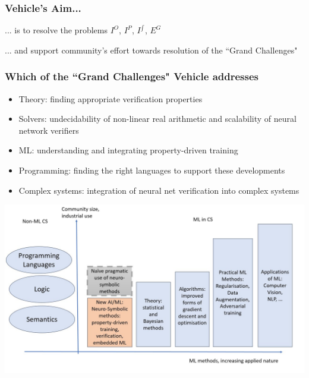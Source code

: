 \documentclass{beamer}
\begin{document}
\begin{frame}
\frametitle{\textbf{Vehicle}'s Aim...}

\alert{... is to resolve the problems $I^O$, $I^P$, $I^{\int}$, $E^G$}
\pause

... and support community's effort towards resolution of the ``Grand Challenges"

\end{frame}

  \begin{frame}
  \frametitle{Which of the ``Grand Challenges" \textbf{Vehicle} addresses}
  \footnotesize{
  \begin{itemize}
  \item Theory: finding appropriate verification properties
\item  Solvers: undecidability of non-linear real arithmetic  and scalability of neural network verifiers 
\item \alert{ML: understanding and integrating property-driven training}
\item \alert{Programming: finding the right languages to support these developments}
\item \alert{Complex systems: integration of neural net verification into complex systems}
  \end{itemize}}
  
  \begin{center}
  \includegraphics[scale=.20]{Images/Slide1.jpg} 
  \end{center}
\end{frame}
\end{document}
